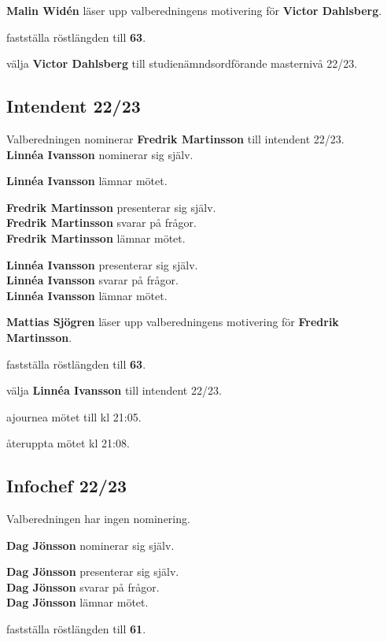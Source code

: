 \documentclass[../protokoll_varmote_2022.tex]{subfiles}
\begin{document}
\textbf{Malin Widén} läser upp valberedningens motivering för \textbf{Victor Dahlsberg}.

\motetbeslutar\att{} fastställa röstlängden till \textbf{63}.

\motetbeslutar\att{} välja \textbf{Victor Dahlsberg} till studienämndsordförande masternivå 22/23.

\subsection{Intendent 22/23}
Valberedningen nominerar \textbf{Fredrik Martinsson} till intendent 22/23. \\
\textbf{Linnéa Ivansson} nominerar sig själv. 

\textbf{Linnéa Ivansson} lämnar mötet.

\textbf{Fredrik Martinsson} presenterar sig själv. \\
\textbf{Fredrik Martinsson} svarar på frågor. \\
\textbf{Fredrik Martinsson} lämnar mötet.

\textbf{Linnéa Ivansson} presenterar sig själv. \\
\textbf{Linnéa Ivansson} svarar på frågor. \\
\textbf{Linnéa Ivansson} lämnar mötet.

\textbf{Mattias Sjögren} läser upp valberedningens motivering för \textbf{Fredrik Martinsson}.

\motetbeslutar\att{} fastställa röstlängden till \textbf{63}.

\motetbeslutar\att{} välja \textbf{Linnéa Ivansson} till intendent 22/23.

\motetbeslutar\att{} ajournea mötet till kl 21:05.

\motetbeslutar\att{} återuppta mötet kl 21:08.

\subsection{Infochef 22/23}
Valberedningen har ingen nominering.

\textbf{Dag Jönsson} nominerar sig själv.

\textbf{Dag Jönsson} presenterar sig själv. \\
\textbf{Dag Jönsson} svarar på frågor. \\
\textbf{Dag Jönsson} lämnar mötet.

\motetbeslutar\att{} fastställa röstlängden till \textbf{61}.
\end{document}
